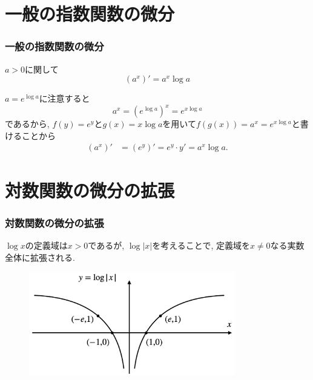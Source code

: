 


\section{一般の指数関数の微分}


\begin{frame}
\frametitle{一般の指数関数の微分}


\begin{Thm} 
$a>0$に関して
$$(a^x)'=a^x \log a$$
\end{Thm}

$a=e^{\log a}$に注意すると
$$
a^x=(e^{\log a})^x=e^{x \log a}
$$
であるから, 
$f(y)=e^y$と$g(x)=x \log a$を用いて$f(g(x))=a^x=e^{x \log a}$と書けることから
\begin{align*} 
(a^x)' &= (e^y)'  =e^y \cdot y' =a^x \log a. 
\end{align*}


\end{frame}




\section{対数関数の微分の拡張}

\begin{frame}
\frametitle{対数関数の微分の拡張}

$\log x$の定義域は$x>0$であるが, $\log |x|$を考えることで, 定義域を$x\neq 0$なる実数全体に拡張される. 

 \begin{figure}[htbp]
 \begin{center} 
  \includegraphics[width=90mm]{calculus5/log_abs.png}
 \end{center}
\end{figure}


\end{frame}


